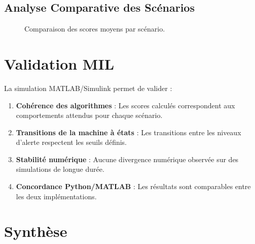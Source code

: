 \documentclass[12pt,a4paper,twoside]{report}
\begin{document}
\subsection{Analyse Comparative des Scénarios}

\begin{figure}[H]
\centering
{}
\caption{Comparaison des scores moyens par scénario.}
\label{fig:score_comparison}
\end{figure}

\section{Validation MIL}

La simulation MATLAB/Simulink permet de valider :

\begin{enumerate}[leftmargin=2cm]
    \item \textbf{Cohérence des algorithmes} : Les scores calculés correspondent aux comportements attendus pour chaque scénario.
    \item \textbf{Transitions de la machine à états} : Les transitions entre les niveaux d'alerte respectent les seuils définis.
    \item \textbf{Stabilité numérique} : Aucune divergence numérique observée sur des simulations de longue durée.
    \item \textbf{Concordance Python/MATLAB} : Les résultats sont comparables entre les deux implémentations.
\end{enumerate}

\section{Synthèse}
\end{document}
